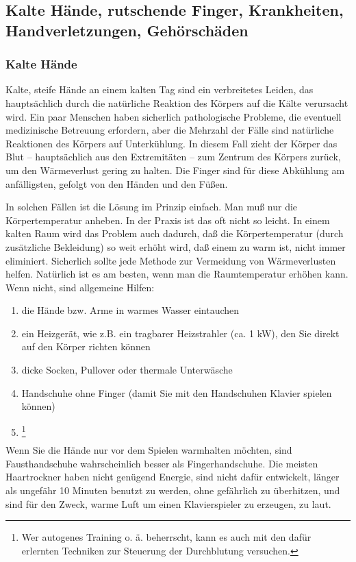 
\subsection{Kalte Hände, rutschende Finger, Krankheiten, Handverletzungen, Gehörschäden}
\label{c1iii10}

\subsubsection{Kalte Hände}

Kalte, steife Hände an einem kalten Tag sind ein verbreitetes Leiden, das hauptsächlich durch die natürliche Reaktion des Körpers auf die Kälte verursacht wird.
Ein paar Menschen haben sicherlich pathologische Probleme, die eventuell medizinische Betreuung erfordern, aber die Mehrzahl der Fälle sind natürliche Reaktionen des Körpers auf Unterkühlung.
In diesem Fall zieht der Körper das Blut -- hauptsächlich aus den Extremitäten -- zum Zentrum des Körpers zurück, um den Wärmeverlust gering zu halten.
Die Finger sind für diese Abkühlung am anfälligsten, gefolgt von den Händen und den Füßen.

In solchen Fällen ist die Lösung im Prinzip einfach.
Man muß nur die Körpertemperatur anheben.
In der Praxis ist das oft nicht so leicht.
In einem kalten Raum wird das Problem auch dadurch, daß die Körpertemperatur (durch zusätzliche Bekleidung) so weit erhöht wird, daß einem zu warm ist, nicht immer eliminiert.
Sicherlich sollte jede Methode zur Vermeidung von Wärmeverlusten helfen.
Natürlich ist es am besten, wenn man die Raumtemperatur erhöhen kann.
Wenn nicht, sind allgemeine Hilfen:

\begin{enumerate}[label={\arabic*.}] 
\item die Hände bzw. Arme in warmes Wasser eintauchen
\item ein Heizgerät, wie z.B. ein tragbarer Heizstrahler (ca. 1 kW), den Sie direkt auf den Körper richten können
\item dicke Socken, Pullover oder thermale Unterwäsche
\item Handschuhe ohne Finger (damit Sie mit den Handschuhen Klavier spielen können)
\item \footnote{Wer autogenes Training o. ä. beherrscht, kann es auch mit den dafür erlernten Techniken zur Steuerung der Durchblutung versuchen.}
\end{enumerate}

Wenn Sie die Hände nur vor dem Spielen warmhalten möchten, sind Fausthandschuhe wahrscheinlich besser als Fingerhandschuhe.
Die meisten Haartrockner haben nicht genügend Energie, sind nicht dafür entwickelt, länger als ungefähr 10 Minuten benutzt zu werden, ohne gefährlich zu überhitzen, und sind für den Zweck, warme Luft um einen Klavierspieler zu erzeugen, zu laut.

